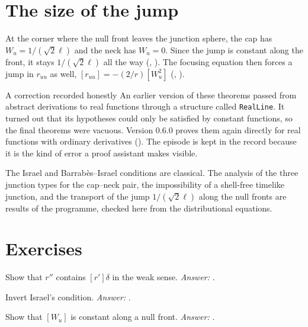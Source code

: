 \section{The size of the jump}

At the corner where the null front leaves the junction sphere, the cap has $W_u=1/(\sqrt2\ell)$ and the neck has $W_u=0$. Since the jump is constant along the front, it stays $1/(\sqrt2\ell)$ all the way (, ). The focusing equation then forces a jump in $r_{uu}$ as well, $[r_{uu}]=-(2/r)[W_u^2]$ (, ).

\begin{asidebox}{A correction recorded honestly}
An earlier version of these theorems passed from abstract derivations to real functions through a structure called \texttt{RealLine}. It turned out that its hypotheses could only be satisfied by constant functions, so the final theorems were vacuous. Version 0.6.0 proves them again directly for real functions with ordinary derivatives (). The episode is kept in the record because it is the kind of error a proof assistant makes visible.
\end{asidebox}

\begin{standsbox}
The Israel and Barrabès--Israel conditions are classical. The analysis of the three junction types for the cap--neck pair, the impossibility of a shell-free timelike junction, and the transport of the jump $1/(\sqrt2\ell)$ along the null fronts are results of the programme, checked here from the distributional equations.
\end{standsbox}

\section*{Exercises}
\begin{exercise}Show that $r''$ contains $[r']\delta$ in the weak sense. \emph{Answer:} .\end{exercise}
\begin{exercise}Invert Israel's condition. \emph{Answer:} .\end{exercise}
\begin{exercise}Show that $[W_u]$ is constant along a null front. \emph{Answer:} .\end{exercise}
